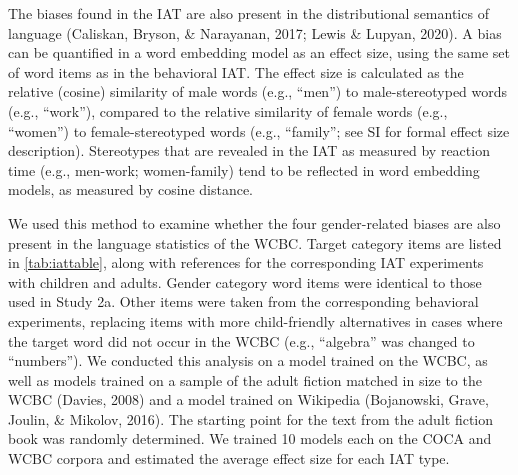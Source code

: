 \documentclass[
  english,
  ,man,floatsintext]{apa6}
\begin{document}
The biases found in the IAT are also present in the distributional semantics of language (Caliskan, Bryson, \& Narayanan, 2017; Lewis \& Lupyan, 2020). A bias can be quantified in a word embedding model as an effect size, using the same set of word items as in the behavioral IAT. The effect size is calculated as the relative (cosine) similarity of male words (e.g., ``men'') to male-stereotyped words (e.g., ``work''), compared to the relative similarity of female words (e.g., ``women'') to female-stereotyped words (e.g., ``family''; see SI for formal effect size description). Stereotypes that are revealed in the IAT as measured by reaction time (e.g., men-work; women-family) tend to be reflected in word embedding models, as measured by cosine distance.

We used this method to examine whether the four gender-related biases are also present in the language statistics of the WCBC. Target category items are listed in \autoref{tab:iattable}, along with references for the corresponding IAT experiments with children and adults. Gender category word items were identical to those used in Study 2a. Other items were taken from the corresponding behavioral experiments, replacing items with more child-friendly alternatives in cases where the target word did not occur in the WCBC (e.g., ``algebra'' was changed to ``numbers''). We conducted this analysis on a model trained on the WCBC, as well as models trained on a sample of the adult fiction matched in size to the WCBC (Davies, 2008) and a model trained on Wikipedia (Bojanowski, Grave, Joulin, \& Mikolov, 2016). The starting point for the text from the adult fiction book was randomly determined. We trained 10 models each on the COCA and WCBC corpora and estimated the average effect size for each IAT type.

\begingroup\fontsize{9}{11}\selectfont
\end{document}
